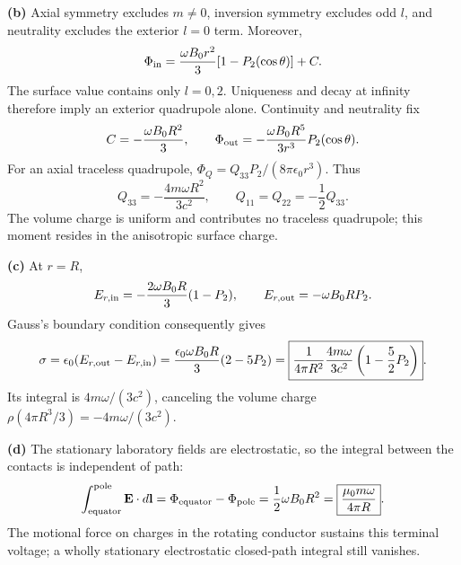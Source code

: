 \textbf{(b)} Axial symmetry excludes $m\ne0$, inversion symmetry excludes
odd $l$, and neutrality excludes the exterior $l=0$ term. Moreover,
\[
\Phi_{\rm in}=\frac{\omega B_0r^2}{3}[1-P_2(\cos\theta)]+C.
\]
The surface value contains only $l=0,2$. Uniqueness and decay at infinity
therefore imply an exterior quadrupole alone. Continuity and neutrality fix
\[
C=-\frac{\omega B_0R^2}{3},\qquad
\Phi_{\rm out}=-\frac{\omega B_0R^5}{3r^3}P_2(\cos\theta).
\]
For an axial traceless quadrupole,
$\Phi_Q=Q_{33}P_2/(8\pi\epsilon_0r^3)$. Thus
\[
\boxed{Q_{33}=-\frac{4m\omega R^2}{3c^2},\qquad
Q_{11}=Q_{22}=-\frac12Q_{33}.}
\]
The volume charge is uniform and contributes no traceless quadrupole;
this moment resides in the anisotropic surface charge.

\textbf{(c)} At $r=R$,
\[
E_{r,\rm in}=-\frac{2\omega B_0R}{3}(1-P_2),\qquad
E_{r,\rm out}=-\omega B_0R P_2.
\]
Gauss's boundary condition consequently gives
\[
\sigma=\epsilon_0(E_{r,\rm out}-E_{r,\rm in})
=\frac{\epsilon_0\omega B_0R}{3}(2-5P_2)
=\boxed{\frac1{4\pi R^2}\frac{4m\omega}{3c^2}
\left(1-\frac52P_2\right)}.
\]
Its integral is $4m\omega/(3c^2)$, canceling the volume charge
$\rho(4\pi R^3/3)=-4m\omega/(3c^2)$.

\textbf{(d)} The stationary laboratory fields are electrostatic, so the
integral between the contacts is independent of path:
\[
\int_{\rm equator}^{\rm pole}\mathbf E\cdot d\mathbf l
=\Phi_{\rm equator}-\Phi_{\rm pole}
=\frac12\omega B_0R^2
=\boxed{\frac{\mu_0m\omega}{4\pi R}}.
\]
The motional force on charges in the rotating conductor sustains this
terminal voltage; a wholly stationary electrostatic closed-path integral
still vanishes.

